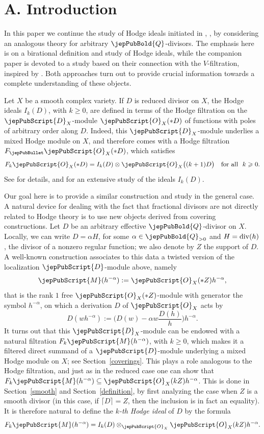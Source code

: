 \section*{A. Introduction}
In this paper we continue the study of Hodge ideals initiated in \cite{MP1}, \cite{MP2}, by considering an analogous theory 
for arbitrary $\jepPubBold{Q}$-divisors. The emphasis here is on a birational definition and study of Hodge ideals, while the companion 
paper \cite{MP3} is devoted to a study based on their connection with the $V$-filtration, inspired by \cite{Saito-MLCT}. Both 
approaches turn out to provide crucial information towards a complete understanding of these objects.

Let $X$ be a smooth complex variety. If $D$ is reduced divisor on $X$, the Hodge ideals $I_k (D)$, with $k \geqslant 0$, 
are defined in terms of the Hodge filtration 
on the $\jepPubScript{D}_X$-module $\jepPubScript{O}_X(*D)$ of functions with poles of arbitrary order along $D$. Indeed, this 
$\jepPubScript{D}_X$-module
underlies a mixed Hodge module on $X$, and therefore comes with a Hodge filtration $F_\jepPubBullet \jepPubScript{O}_X (*D)$, which satisfies
$$F_k \jepPubScript{O}_X(*D) = I_k (D) \otimes \jepPubScript{O}_X\big( (k+1)D\big)\quad\text{for all}\,\,\,\, k \geqslant 0.$$
See \cite{MP1} for details, and for an extensive study of the ideals $I_k (D)$.

Our goal here is to provide a similar construction and study in the general case. A natural device for dealing with the 
fact that fractional divisors are not directly related to Hodge theory is to use new objects derived from covering constructions.
Let $D$ be an arbitrary effective $\jepPubBold{Q}$-divisor on $X$. Locally, we can write $D = \alpha H$, for 
some $\alpha \in \jepPubBold{Q}_{> 0}$ and $H = {\rm div} (h)$, the divisor of a nonzero regular function; we also denote by $Z$ the support of $D$.
A well-known construction associates to this data a twisted version of the localization $\jepPubScript{D}$-module above, namely
$$\jepPubScript{M} (h^{-\alpha}) : = \jepPubScript{O}_X (*Z) h^{-\alpha},$$
that is the rank $1$ free $\jepPubScript{O}_X(*Z)$-module 
with generator the symbol $h^{-\alpha}$, on which a derivation $D$ of $\jepPubScript{O}_X$ acts by
$$D(wh^{-\alpha}) :=\Big(D(w) - \alpha w\frac{ D(h)}{h}\Big)h^{-\alpha}.$$
It turns out that this $\jepPubScript{D}_X$-module can be endowed with a natural filtration $F_k \jepPubScript{M} (h^{-\alpha})$, with 
$k \geqslant 0$, which makes it a filtered direct summand of a $\jepPubScript{D}$-module underlying a mixed Hodge module on $X$; see 
Section~\ref{coverings}. This plays a role 
analogous to the Hodge filtration, and just as in the reduced case one can show that $F_k \jepPubScript{M} (h^{-\alpha}) \subseteq 
\jepPubScript{O}_X (kZ ) h^{-\alpha}$. This is done in Section~\ref{smooth} and Section~\ref{definition}, by first analyzing the case when $Z$ is a smooth divisor 
(in this case, if $\lceil D\rceil=Z$, then
the inclusion is in fact an equality). It is therefore natural to define the \emph{$k$-th Hodge ideal} of $D$ by the formula
$$F_k \jepPubScript{M} (h^{-\alpha}) = I_k (D) \otimes_{\jepPubScript{O}_X} \jepPubScript{O}_X (kZ ) h^{-\alpha}.$$ 

